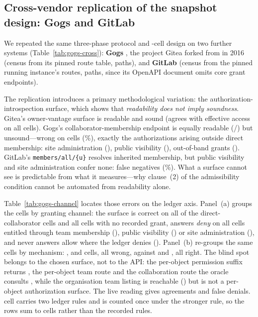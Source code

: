 \subsection{Cross-vendor replication of the snapshot design: Gogs \GgVersion{} and GitLab \GlVersion{}}
\label{sec:gogs}

We repeated the same three-phase protocol and \ResRsCellsSnapshot{}-cell design on two further
systems (Table~\ref{tab:gogs-cross}): \textbf{Gogs} \GgVersion{}, the project Gitea forked from
in 2016 (census from its pinned route table, \GgRoutePaths{} paths), and \textbf{GitLab}
\GlVersion{} (census from the pinned running instance's routes, \GlRoutePaths{} paths, since
its OpenAPI document omits core grant endpoints).



The replication introduces a primary methodological variation: the authorization-introspection
surface, which shows that \emph{readability does not imply soundness}. Gitea's owner-vantage
surface is readable and sound (agrees with effective access on all \GtOracleAgree{} cells).
Gogs's collaborator-membership endpoint is equally readable (\GgOracleReadable{}/\GgCells{})
but unsound---wrong on \GgOracleWrong{} cells (\GgOracleWrongPct\%), exactly the authorizations
arising outside direct membership: site administration (\GgFnSiteAdmin{}), public visibility
(\GgFnPublic{}), out-of-band grants (\GgFnOob{}). GitLab's \texttt{members/all/\{u\}} resolves
inherited membership, but public visibility and site administration confer none:
\GlOracleWrong{} false negatives (\GlOracleWrongPct\%). What a surface cannot see is
predictable from what it measures---why clause~(2) of the admissibility condition cannot be
automated from readability alone.



Table~\ref{tab:gogs-channel} locates those \GgOracleWrong{} errors on the ledger axis.
Panel~(a) groups the \GgChCells{} cells by granting channel: the surface is correct on all
\GgChCollaboratorAgree{} of the \GgChCollaborator{} direct-collaborator cells and all
\GgChNone{} cells with no recorded grant, answers \emph{deny} on all \GgChFalseDeny{} cells
entitled through team membership (\GgChTeamFalseDeny{}), public visibility
(\GgChPublicFalseDeny{}) or site administration (\GgChSiteAdminFalseDeny{}), and never answers
allow where the ledger denies (\GgChFalseAllow{}). Panel~(b) re-groups the same cells by
mechanism: \GgChSrcTeam{}, \GgChSrcPublic{} and \GgChSrcSiteAdmin{} cells, all wrong, against
\GgChSrcCollaborator{} and \GgChSrcNone{}, all right. The blind spot belongs to the chosen
surface, not to the API: the per-object permission suffix returns \GgChProbePermSuffix{}, the
per-object team route \GgChProbeTeamMember{} and the collaboration route the oracle consults
\GgChProbeCollabGet{}, while the organisation team listing is reachable
(\GgChProbeOrgTeams{}) but is not a per-object authorization surface. The live reading gives
\GgChLiveAgree{} agreements and \GgChLiveFalseDeny{} false denials. \GgChMultiBasis{} cell
carries two ledger rules and is counted once under the stronger rule, so the rows sum to
\GgChCells{} cells rather than the \GgChRules{} recorded rules.

